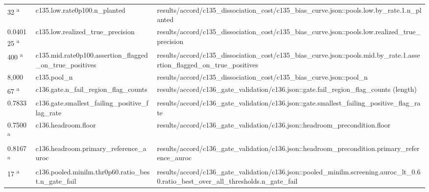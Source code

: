 \begin{longtable}{@{}p{0.7in}p{1.9in}p{2.6in}@{}}
32 \textsuperscript{a} & c135.\allowbreak{}low.\allowbreak{}rate0p100.\allowbreak{}n\_planted & results/\allowbreak{}accord/\allowbreak{}c135\_dissociation\_cost/\allowbreak{}c135\_bias\_curve.\allowbreak{}json::pools.\allowbreak{}low.\allowbreak{}by\_rate.\allowbreak{}1.\allowbreak{}n\_planted\\
0.040125 \textsuperscript{a} & c135.\allowbreak{}low.\allowbreak{}realized\_true\_precision & results/\allowbreak{}accord/\allowbreak{}c135\_dissociation\_cost/\allowbreak{}c135\_bias\_curve.\allowbreak{}json::pools.\allowbreak{}low.\allowbreak{}realized\_true\_precision\\
400 \textsuperscript{a} & c135.\allowbreak{}mid.\allowbreak{}rate0p100.\allowbreak{}assertion\_flagged\_on\_true\_positives & results/\allowbreak{}accord/\allowbreak{}c135\_dissociation\_cost/\allowbreak{}c135\_bias\_curve.\allowbreak{}json::pools.\allowbreak{}mid.\allowbreak{}by\_rate.\allowbreak{}1.\allowbreak{}assertion\_flagged\_on\_true\_positives\\
8,000 & c135.\allowbreak{}pool\_n & results/\allowbreak{}accord/\allowbreak{}c135\_dissociation\_cost/\allowbreak{}c135\_bias\_curve.\allowbreak{}json::pool\_n\\
67 \textsuperscript{a} & c136.\allowbreak{}gate.\allowbreak{}n\_fail\_region\_flag\_counts & results/\allowbreak{}accord/\allowbreak{}c136\_gate\_validation/\allowbreak{}c136.\allowbreak{}json::gate.\allowbreak{}fail\_region\_flag\_counts (length)\\
0.7833 & c136.\allowbreak{}gate.\allowbreak{}smallest\_failing\_positive\_flag\_rate & results/\allowbreak{}accord/\allowbreak{}c136\_gate\_validation/\allowbreak{}c136.\allowbreak{}json::gate.\allowbreak{}smallest\_failing\_positive\_flag\_rate\\
0.7500 \textsuperscript{a} & c136.\allowbreak{}headroom.\allowbreak{}floor & results/\allowbreak{}accord/\allowbreak{}c136\_gate\_validation/\allowbreak{}c136.\allowbreak{}json::headroom\_precondition.\allowbreak{}floor\\
0.8167 \textsuperscript{a} & c136.\allowbreak{}headroom.\allowbreak{}primary\_reference\_auroc & results/\allowbreak{}accord/\allowbreak{}c136\_gate\_validation/\allowbreak{}c136.\allowbreak{}json::headroom\_precondition.\allowbreak{}primary\_reference\_auroc\\
17 \textsuperscript{a} & c136.\allowbreak{}pooled.\allowbreak{}minilm.\allowbreak{}thr0p60.\allowbreak{}ratio\_best.\allowbreak{}n\_gate\_fail & results/\allowbreak{}accord/\allowbreak{}c136\_gate\_validation/\allowbreak{}c136.\allowbreak{}json::pooled\_minilm.\allowbreak{}screening.\allowbreak{}auroc\_lt\_0.\allowbreak{}60.\allowbreak{}ratio\_best\_over\_all\_thresholds.\allowbreak{}n\_gate\_fail\\

\end{longtable}
